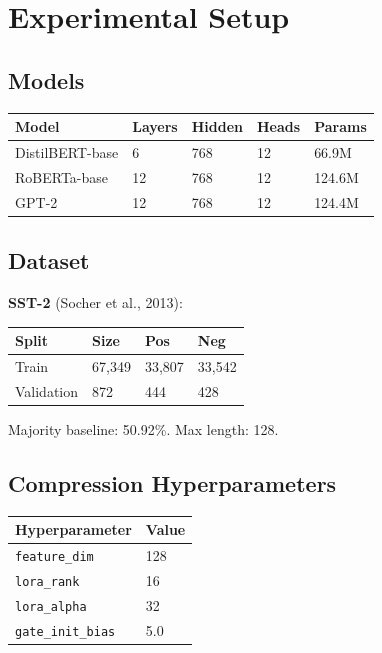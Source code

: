 \section{Experimental Setup}

\subsection{Models}

\begin{table}[H]
\centering
\small
\begin{tabular}{lllll}
\toprule
\textbf{Model} & \textbf{Layers} & \textbf{Hidden} & \textbf{Heads} & \textbf{Params} \\
\midrule
DistilBERT-base & 6 & 768 & 12 & 66.9M \\
RoBERTa-base & 12 & 768 & 12 & 124.6M \\
GPT-2 & 12 & 768 & 12 & 124.4M \\
\bottomrule
\end{tabular}
\end{table}

\subsection{Dataset}

\textbf{SST-2} (Socher et al., 2013):

\begin{table}[H]
\centering
\small
\begin{tabular}{llll}
\toprule
\textbf{Split} & \textbf{Size} & \textbf{Pos} & \textbf{Neg} \\
\midrule
Train & 67,349 & 33,807 & 33,542 \\
Validation & 872 & 444 & 428 \\
\bottomrule
\end{tabular}
\end{table}

Majority baseline: 50.92\%. Max length: 128.

\subsection{Compression Hyperparameters}

\begin{table}[H]
\centering
\small
\begin{tabular}{ll}
\toprule
\textbf{Hyperparameter} & \textbf{Value} \\
\midrule
\texttt{feature\_dim} & 128 \\
\texttt{lora\_rank} & 16 \\
\texttt{lora\_alpha} & 32 \\
\texttt{gate\_init\_bias} & 5.0 \\
\bottomrule
\end{tabular}
\end{table}

